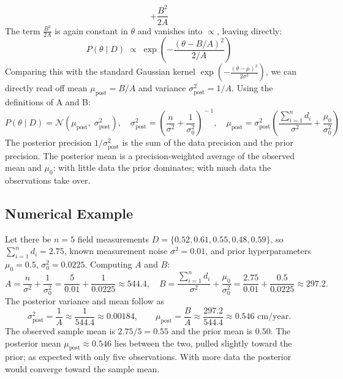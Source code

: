 \documentclass[12pt, a4paper]{article}
\begin{document}
\begin{enumerate}
\[      + \frac{B^2}{2A}
\]
The term $\frac{B^2}{2A}$ is again constant in $\theta$ and vanishes
into $\propto$, leaving directly:
\[
    P(\theta \mid D)
    \;\propto\;
    \exp\!\left(-\frac{\left(\theta - B/A\right)^2}{2/A}\right)
\]
Comparing this with the standard Gaussian kernel
$\exp\!\left(-\frac{(\theta-\mu)^2}{2\sigma^2}\right)$,
we can directly read off mean $\mu_\text{post}= B/A$ and variance $\sigma_\text{post}^2 = 1/A$. Using the definitions of A and B:
\[
    \boxed{
    P(\theta \mid D) = \mathcal{N}(\mu_\text{post},\;
    \sigma_\text{post}^2), \quad
    \sigma_\text{post}^2
        = \left(\frac{n}{\sigma^2}+\frac{1}{\sigma_0^2}\right)^{\!-1},
    \quad
    \mu_\text{post}
        = \sigma_\text{post}^2\!
          \left(\frac{\sum_{i=1}^n d_i}{\sigma^2}
               +\frac{\mu_0}{\sigma_0^2}\right)
    }
\]
The posterior precision $1/\sigma_\text{post}^2$ is the sum of the
data precision and the prior precision. The posterior mean is a
precision-weighted average of the observed mean and $\mu_0$: with
little data the prior dominates; with much data the observations
take over.

\end{enumerate}

\subsection{Numerical Example}
Let there be
$n = 5$ field measurements $D = \{0.52, 0.61, 0.55, 0.48, 0.59\}$,
so $\sum_{i=1}^n d_i = 2.75$, known measurement noise $\sigma^2 = 0.01$,
and prior hyperparameters $\mu_0 = 0.5$, $\sigma_0^2 = 0.0225$.
Computing $A$ and $B$:
\[
    A = \frac{n}{\sigma^2} + \frac{1}{\sigma_0^2}
      = \frac{5}{0.01} + \frac{1}{0.0225}
      \approx 544.4, \quad
    B = \frac{\sum_{i=1}^n d_i}{\sigma^2} + \frac{\mu_0}{\sigma_0^2}
      = \frac{2.75}{0.01} + \frac{0.5}{0.0225}
      \approx 297.2.
\]
The posterior variance and mean follow as
\[
    \sigma_\text{post}^2 = \frac{1}{A} \approx \frac{1}{544.4} \approx 0.00184,
    \qquad
    \mu_\text{post} = \frac{B}{A} \approx \frac{297.2}{544.4} \approx 0.546 \text{ cm/year}.
\]
The observed sample mean is $2.75/5 = 0.55$ and the prior mean is $0.50$.
The posterior mean $\mu_\text{post} \approx 0.546$ lies between the two,
pulled slightly toward the prior; as expected with only five observations.
With more data the posterior would converge toward the sample mean.



\end{document}
